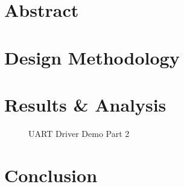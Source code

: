 \documentclass[CMPE]{KGCOEReport}
\begin{document}
\maketitle

\tableofcontents	%
\newpage			%

\section*{Abstract}
		
\section*{Design Methodology}

\section*{Results \& Analysis}

\begin{figure}[H]
	\centering
	\caption{UART Driver Demo Part 2}
	\label{Figure 1}
\end{figure}

\section*{Conclusion}


\newpage
%
\end{document}
